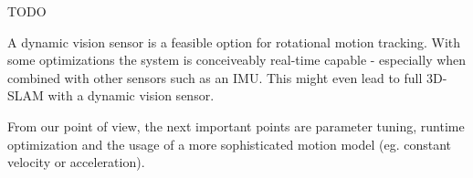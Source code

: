 TODO

A dynamic vision sensor is a feasible option for rotational motion tracking. With
some optimizations the system is conceiveably real-time capable - especially
when combined with other sensors such as an IMU. This might even lead to full
3D-SLAM with a dynamic vision sensor.

From our point of view, the next important points are parameter tuning, runtime
optimization and the usage of a more sophisticated motion model (eg. constant
velocity or acceleration).
